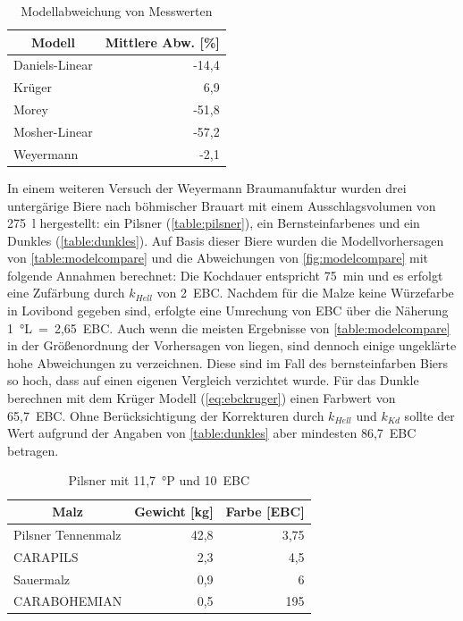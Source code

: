\documentclass[a4paper,parskip=half]{scrartcl}
\newcommand{\khell}{k_{Hell}}
\newcommand{\kkd}{k_{Kd}}
\begin{document}
\begin{table}[H]
\centering
\begin{tabular}{lr}
\toprule
\multicolumn{1}{c}{\textbf{Modell}} & \multicolumn{1}{c}{\textbf{Mittlere Abw. [\%]}} \\
\midrule
Daniels-Linear & -14,4 \\
Krüger & 6,9 \\
Morey & -51,8 \\
Mosher-Linear & -57,2 \\
Weyermann & -2,1 \\
\bottomrule
\end{tabular}
\caption{Modellabweichung von Messwerten \parencite{KrausWeyermann2021b}}
\label{table:modelcompareall}
\end{table}

In einem weiteren Versuch der Weyermann Braumanufaktur wurden drei untergärige Biere nach böhmischer Brauart mit einem Ausschlagsvolumen von 275~l hergestellt: ein Pilsner (\autoref{table:pilsner}), ein Bernsteinfarbenes und ein Dunkles (\autoref{table:dunkles}). Auf Basis dieser Biere wurden die Modellvorhersagen von \autoref{table:modelcompare} und die Abweichungen von \autoref{fig:modelcompare} mit folgende Annahmen berechnet: Die Kochdauer entspricht 75~min und es erfolgt eine Zufärbung durch $\khell$ von 2~EBC. Nachdem für die Malze keine Würzefarbe in Lovibond gegeben sind, erfolgte eine Umrechung von EBC über die Näherung 1~°L~=~2,65~EBC. Auch wenn die meisten Ergebnisse von \autoref{table:modelcompare} in der Größenordnung der Vorhersagen von \textcite{KrausWeyermann2022} liegen, sind dennoch einige ungeklärte hohe Abweichungen zu verzeichnen. Diese sind im Fall des bernsteinfarben Biers so hoch, dass auf einen eigenen Vergleich verzichtet wurde. Für das Dunkle berechnen \textcite{KrausWeyermann2022} mit dem Krüger Modell (\autoref{eq:ebckruger}) einen Farbwert von 65,7~EBC. Ohne Berücksichtigung der Korrekturen durch $\khell$ und $\kkd$ sollte der Wert aufgrund der Angaben von \autoref{table:dunkles} aber mindesten 86,7~EBC betragen.

\begin{table}[H]
\centering
\begin{tabular}{lrr}
\toprule
\multicolumn{1}{c}{\textbf{Malz}} & \multicolumn{1}{c}{\textbf{Gewicht [kg]}} & \multicolumn{1}{c}{\textbf{Farbe [EBC]}} \\
\midrule
Pilsner Tennenmalz & 42,8 & 3,75 \\
CARAPILS & 2,3 & 4,5 \\
Sauermalz & 0,9 & 6 \\
CARABOHEMIAN & 0,5 & 195 \\
\bottomrule
\end{tabular}
\caption{Pilsner mit 11,7~°P und 10~EBC \parencite{KrausWeyermann2022}}
\label{table:pilsner}
\end{table}
\end{document}
